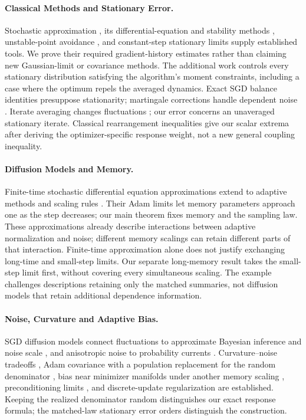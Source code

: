 \paragraph{Classical Methods and Stationary Error.}
Stochastic approximation \cite{robbinsmonro1951}, its differential-equation
and stability methods \cite{kushneryin2003,benaim1999,borkarmeyn2000},
unstable-point avoidance \cite{pemantle1990}, and constant-step stationary
limits \cite{fortpages,ddb,chenmoumaguluri2022} supply established tools.
We prove their required gradient-history estimates rather than claiming new
Gaussian-limit or covariance methods. The additional work controls every
stationary distribution satisfying the algorithm's moment constraints,
including a case where
the optimum repels the averaged dynamics. Exact SGD balance identities
\cite{yaida2019} presuppose stationarity; martingale corrections handle
dependent noise \cite{fort2015}. Iterate averaging changes fluctuations
\cite{polyakjuditsky1992,mouetal2020}; our error concerns an unaveraged
stationary iterate. Classical rearrangement inequalities
\cite{cambanissimonsstout1976} give our scalar extrema after deriving the
optimizer-specific response weight, not a new general coupling inequality.

\paragraph{Diffusion Models and Memory.}
Finite-time stochastic differential equation approximations
\cite{litaie2017} extend to adaptive methods and scaling rules
\cite{malladi,compagnoni}. Their Adam limits let memory parameters approach
one as the step decreases; our main theorem fixes memory and the sampling
law. These approximations already describe interactions between adaptive
normalization and noise; different memory scalings can retain different
parts of that interaction. Finite-time approximation alone does not justify
exchanging long-time and small-step limits. Our separate long-memory result takes the small-step
limit first, without covering every simultaneous scaling. The example
challenges descriptions retaining only the matched summaries, not diffusion
models that retain additional dependence information.

\paragraph{Noise, Curvature and Adaptive Bias.}
SGD diffusion models connect fluctuations to approximate Bayesian inference
and noise scale \cite{mandt2017,smithle2018}, and anisotropic noise to
probability currents \cite{chaudharisoatto2018}. Curvature--noise tradeoffs
\cite{thomas}, Adam covariance with a population replacement for the
random denominator \cite{liu2021}, bias near minimizer manifolds under
another memory scaling \cite{liwenlyu}, preconditioning limits \cite{das},
and discrete-update regularization \cite{cattaneo} are established.
Keeping the realized denominator random distinguishes our exact response
formula; the matched-law stationary error orders distinguish the
construction.

